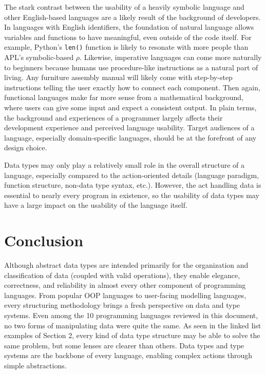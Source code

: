 \documentclass{article}
\begin{document}
The stark contrast between the usability of a heavily symbolic language and other English-based languages
are a likely result of the background of developers. In languages with English identifiers,
the foundation of natural language allows variables and functions to have meaningful, even outside of the code itself.
For example, Python's \texttt{len()} function is likely to resonate with more people than APL's symbolic-based $\rho$.
Likewise, imperative languages can come more naturally to beginners because humans use procedure-like instructions
as a natural part of living. Any furniture assembly manual will likely come with step-by-step instructions
telling the user exactly how to connect each component. Then again, functional languages make far more sense from
a mathematical background, where users can give some input and expect a consistent output.
In plain terms, the background and experiences of a programmer largely affects their development experience and perceived
language usability. Target audiences of a language, especially domain-specific languages,
should be at the forefront of any design choice.

Data types may only play a relatively small role in the overall structure of a language, especially
compared to the action-oriented details (language paradigm, function structure, non-data type syntax, etc.).
However, the act handling data is essential to nearly every program in existence,
so the usability of data types may have a large impact on the usability of the language itself.



\section{Conclusion}

Although abstract data types are intended primarily for the organization and classification of data (coupled with valid operations),
they enable elegance, correctness, and reliability in almost every other component of programming languages.
From popular OOP languages to user-facing modelling languages, every structuring methodology
brings a fresh perspective on data and type systems. Even among the 10 programming languages
reviewed in this document, no two forms of manipulating data were quite the same.
As seen in the linked list examples of Section 2, every kind of data type structure may be able to solve the same problem,
but some lenses are clearer than others. Data types and type systems are the backbone of every language,
enabling complex actions through simple abstractions.

\pagebreak
\nocite{*} %
\printbibliography %
\end{document}
